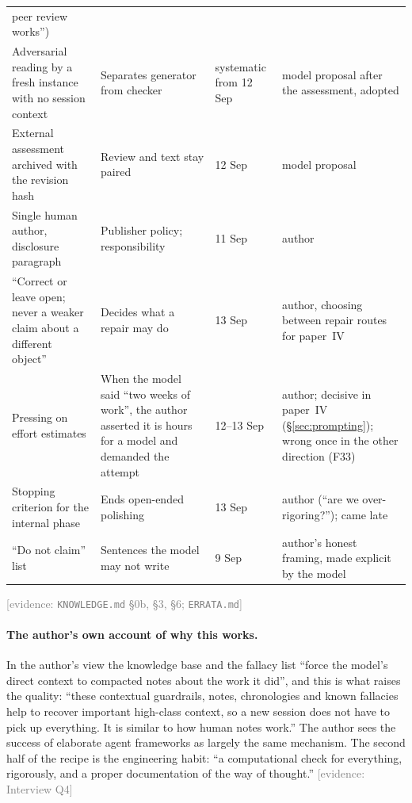 \documentclass[11pt,a4paper]{article}
\newcommand{\evidence}[1]{{\footnotesize\textcolor{Gray}{[evidence: #1]}}}
\newcommand{\file}[1]{\texttt{#1}}
\begin{document}
\begin{longtable}{@{}p{3.2cm}p{5.1cm}p{1.8cm}p{4.0cm}@{}}
peer review works'')\\
Adversarial reading by a fresh instance with no session context & Separates generator from checker & systematic
from 12 Sep & model proposal after the assessment, adopted\\
External assessment archived with the revision hash & Review and text stay paired & 12 Sep & model proposal\\
Single human author, disclosure paragraph & Publisher policy; responsibility & 11 Sep & author\\
``Correct or leave open; never a weaker claim about a different object'' & Decides what a repair may do & 13 Sep &
author, choosing between repair routes for paper~IV\\
Pressing on effort estimates & When the model said ``two weeks of work'', the author asserted it is hours for a
model and demanded the attempt & 12--13 Sep & author; decisive in paper~IV (\S\ref{sec:prompting}); wrong once in the
other direction (F33)\\
Stopping criterion for the internal phase & Ends open-ended polishing & 13 Sep & author (``are we over-rigoring?'');
came late\\
``Do not claim'' list & Sentences the model may not write & 9 Sep & author's honest framing, made explicit by the
model\\
\bottomrule
\end{longtable}
\evidence{\file{KNOWLEDGE.md} \S0b, \S3, \S6; \file{ERRATA.md}}
\paragraph{The author's own account of why this works.} In the author's view the knowledge base and the fallacy
list ``force the model's direct context to compacted notes about the work it did'', and this is what raises the
quality: ``these contextual guardrails, notes, chronologies and known fallacies help to recover important high-class
context, so a new session does not have to pick up everything. It is similar to how human notes work.'' The author
sees the success of elaborate agent frameworks as largely the same mechanism. The second half of the recipe is the
engineering habit: ``a computational check for everything, rigorously, and a proper documentation of the way of
thought.'' \evidence{Interview Q4}
\end{document}

